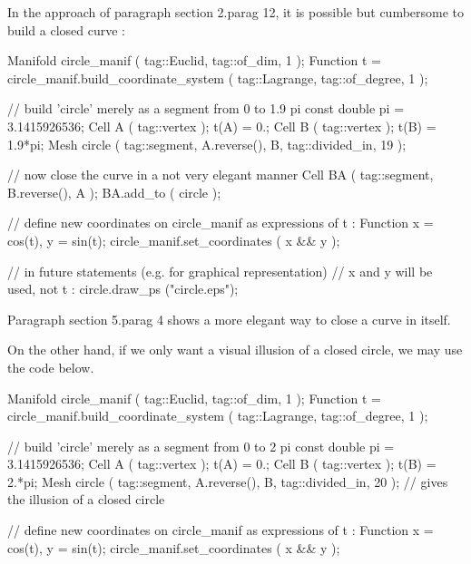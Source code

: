 In the approach of paragraph \numb section 2.\numb parag 12, it is possible but cumbersome to
build a closed curve :

\verbatim
   Manifold circle_manif ( tag::Euclid, tag::of_dim, 1 );
   Function t = circle_manif.build_coordinate_system
      ( tag::Lagrange, tag::of_degree, 1 );

   // build 'circle' merely as a segment from 0 to 1.9 pi
   const double pi = 3.1415926536;
   Cell A ( tag::vertex );  t(A) =  0.;
   Cell B ( tag::vertex );  t(B) =  1.9*pi;
   Mesh circle ( tag::segment, A.reverse(), B, tag::divided_in, 19 );

   // now close the curve in a not very elegant manner
   Cell BA ( tag::segment, B.reverse(), A );
   BA.add_to ( circle );

   // define new coordinates on circle_manif as expressions of t :
   Function x = cos(t), y = sin(t);
   circle_manif.set_coordinates ( x && y );

   // in future statements (e.g. for graphical representation)
   // x and y will be used, not t :
   circle.draw_ps ("circle.eps");
\endverbatim


Paragraph \numb section 5.\numb parag 4 shows a more elegant way to close a curve in itself.

On the other hand, if we only want a visual illusion of a closed circle, we may use the code below.

\verbatim
   Manifold circle_manif ( tag::Euclid, tag::of_dim, 1 );
   Function t = circle_manif.build_coordinate_system
      ( tag::Lagrange, tag::of_degree, 1 );

   // build 'circle' merely as a segment from 0 to 2 pi
   const double pi = 3.1415926536;
   Cell A ( tag::vertex );  t(A) =  0.;
   Cell B ( tag::vertex );  t(B) =  2.*pi;
   Mesh circle ( tag::segment, A.reverse(), B, tag::divided_in, 20 );
   // gives the illusion of a closed circle

   // define new coordinates on circle_manif as expressions of t :
   Function x = cos(t), y = sin(t);
   circle_manif.set_coordinates ( x && y );
\endverbatim


